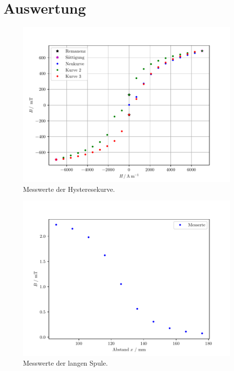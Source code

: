 \section{Auswertung}
\label{sec:Auswertung}

\begin{figure}
  \centering
  
  \includegraphics{hysterese.pdf}
  \caption{Messwerte der Hysteresekurve.}
  \label{fig:Hysterese}
\end{figure}



\begin{figure}
  \centering
  \includegraphics{langeSpule.pdf}
  \caption{Messwerte der langen Spule.}
  \label{fig:Spule}
\end{figure}



